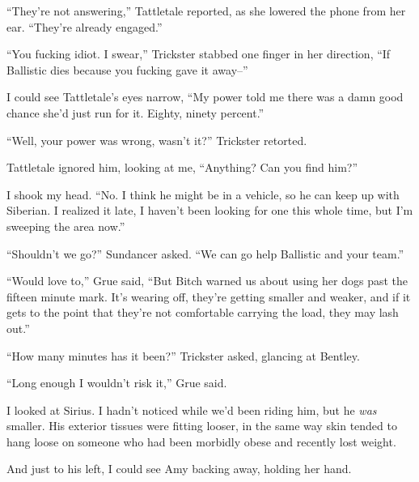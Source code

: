 





``They're not answering,'' Tattletale reported, as she lowered the phone from her ear.  ``They're already engaged.''



``You fucking idiot.  I swear,'' Trickster stabbed one finger in her direction, ``If Ballistic dies because you fucking gave it away--''



I could see Tattletale's eyes narrow, ``My power told me there was a damn good chance she'd just run for it.  Eighty, ninety percent.''



``Well, your power was wrong, wasn't it?'' Trickster retorted.



Tattletale ignored him, looking at me, ``Anything?  Can you find him?''



I shook my head.  ``No.  I think he might be in a vehicle, so he can keep up with Siberian.  I realized it late, I haven't been looking for one this whole time, but I'm sweeping the area now.''



``Shouldn't we go?'' Sundancer asked.  ``We can go help Ballistic and your team.''



``Would love to,'' Grue said, ``But Bitch warned us about using her dogs past the fifteen minute mark.  It's wearing off, they're getting smaller and weaker, and if it gets to the point that they're not comfortable carrying the load, they may lash out.''



``How many minutes has it been?''  Trickster asked, glancing at Bentley.



``Long enough I wouldn't risk it,'' Grue said.



I looked at Sirius.  I hadn't noticed while we'd been riding him, but he \emph{was} smaller.  His exterior tissues were fitting looser, in the same way skin tended to hang loose on someone who had been morbidly obese and recently lost weight.



And just to his left, I could see Amy backing away, holding her hand.



